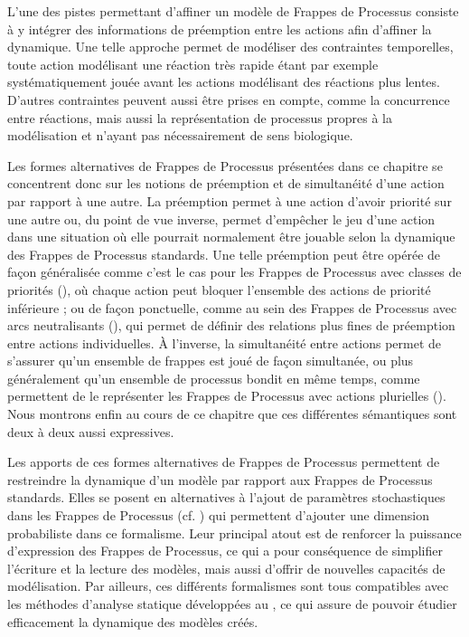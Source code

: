 L'une des pistes permettant d'affiner un modèle de Frappes de Processus consiste à y intégrer
des informations de préemption entre les actions afin d'affiner la dynamique.
Une telle approche permet de modéliser des contraintes temporelles,
toute action modélisant une réaction très rapide étant par exemple systématiquement jouée
avant les actions modélisant des réactions plus lentes.
D'autres contraintes peuvent aussi être prises en compte, comme la concurrence entre réactions,
mais aussi la représentation de processus propres à la modélisation et n'ayant pas nécessairement
de sens biologique.

Les formes alternatives de Frappes de Processus présentées dans ce chapitre se concentrent donc
sur les notions de préemption et de simultanéité d'une action par rapport à une autre.
La préemption permet à une action d'avoir priorité sur une autre ou, du point de vue inverse,
permet d'empêcher le jeu d'une action dans une situation où elle pourrait normalement être jouable
selon la dynamique des Frappes de Processus standards.
Une telle préemption peut être opérée de façon généralisée
comme c'est le cas pour les Frappes de Processus avec classes de priorités (),
où chaque action peut bloquer l'ensemble des actions de priorité inférieure ;
ou de façon ponctuelle, comme au sein des Frappes de Processus avec arcs neutralisants
(),
qui permet de définir des relations plus fines de préemption entre actions individuelles.
À l'inverse, la simultanéité entre actions permet de s'assurer qu'un ensemble de frappes est joué
de façon simultanée, ou plus généralement qu'un ensemble de processus bondit en même temps,
comme permettent de le représenter les Frappes de Processus avec actions plurielles ().
Nous montrons enfin au cours de ce chapitre que ces différentes sémantiques sont deux à deux aussi
expressives.

Les apports de ces formes alternatives de Frappes de Processus permettent de restreindre
la dynamique
d'un modèle par rapport aux Frappes de Processus standards.
Elles se posent en alternatives à l'ajout de paramètres stochastiques dans les Frappes de Processus
(cf. )
qui permettent d'ajouter une dimension probabiliste dans ce formalisme.
Leur principal atout est de renforcer la puissance d'expression des Frappes de Processus,
ce qui a pour conséquence de simplifier l'écriture et la lecture des modèles,
mais aussi d'offrir de nouvelles capacités de modélisation.
Par ailleurs,
ces différents formalismes sont tous compatibles avec les méthodes d'analyse statique
développées au ,
ce qui assure de pouvoir étudier efficacement la dynamique des modèles créés.

